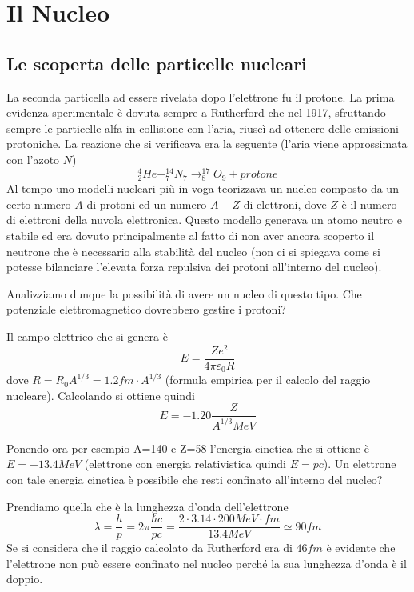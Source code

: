 
\section{Il Nucleo}
\subsection{Le scoperta delle particelle nucleari}
La seconda particella ad essere rivelata dopo l'elettrone fu il protone. 
La prima evidenza sperimentale è dovuta sempre a Rutherford che nel 1917, sfruttando sempre le particelle alfa in collisione con l'aria, riuscì ad ottenere delle emissioni protoniche. La reazione che si verificava era la seguente (l'aria viene approssimata con l'azoto $N$) 
\begin{equation}
^4_2He +^{14}_{7}N_{7}\longrightarrow ^{17}_8O_9+protone
\end{equation}
Al tempo uno modelli nucleari più in voga teorizzava un nucleo composto da un certo numero $A$ di protoni ed un numero $A-Z$ di elettroni, dove $Z$ è il numero di elettroni della nuvola elettronica.
Questo modello generava un atomo neutro e stabile ed era dovuto principalmente al fatto di non aver ancora scoperto il neutrone che è necessario alla stabilità del nucleo (non ci si spiegava come si potesse bilanciare l'elevata forza repulsiva dei protoni all'interno del nucleo).

Analizziamo dunque la possibilità di avere un nucleo di questo tipo.
Che potenziale elettromagnetico dovrebbero gestire i protoni?

Il campo elettrico che si genera è
\[E=\frac{Ze^2}{4\pi\varepsilon_0R}\]
dove $R=R_0 A^{1/3}=1.2fm\cdot A^{1/3}$ (formula empirica per il calcolo del raggio nucleare). 
Calcolando si ottiene quindi
\[E=-1.20\frac{Z}{A^{1/3}MeV}\]

Ponendo ora per esempio A=140 e Z=58 l'energia cinetica che si ottiene è $E=-13.4MeV$ (elettrone con energia relativistica quindi $E=pc$). Un elettrone con tale energia cinetica è possibile che resti confinato all'interno del nucleo?

Prendiamo quella che è la lunghezza d'onda dell'elettrone
\[\lambda=\frac{h}{p}=2\pi \frac{\hbar c}{pc}=\frac{2\cdot 3.14\cdot 200MeV\cdot fm}{13.4MeV}\simeq 90fm\]
Se si considera che il raggio calcolato da Rutherford era di $46fm$ è evidente che l'elettrone non può essere confinato nel nucleo perché la sua lunghezza d'onda è il doppio.

